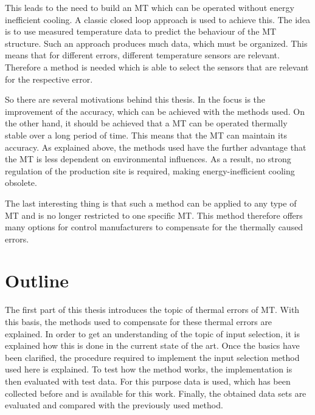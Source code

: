 This leads to the need to build an MT which can be operated without energy inefficient cooling. A classic closed loop approach is used to achieve this. The idea is to use measured temperature data to predict the behaviour of the MT structure. Such an approach produces much data, which must be organized. This means that for different errors, different temperature sensors are relevant. Therefore a method is needed which is able to select the sensors that are relevant for the respective error. 

So there are several motivations behind this thesis. In the focus is the improvement of the accuracy, which can be achieved with the methods used. On the other hand, it should be achieved that a MT can be operated thermally stable over a long period of time. This means that the MT can maintain its accuracy. As explained above, the methods used have the further advantage that the MT is less dependent on environmental influences. As a result, no strong regulation of the production site is required, making energy-inefficient cooling obsolete.

The last interesting thing is that such a method can be applied to any type of MT and is no longer restricted to one specific MT. This method therefore offers many options for control manufacturers to compensate for the thermally caused errors.



\section{Outline} %
\label{sec:outline}


The first part of this thesis introduces the topic of thermal errors of MT. With this basis, the methods used to compensate for these thermal errors are explained. In order to get an understanding of the topic of input selection, it is explained how this is done in the current state of the art. Once the basics have been clarified, the procedure required to implement the input selection method used here is explained. To test how the method works, the implementation is then evaluated with test data. For this purpose data is used, which has been collected before and is available for this work. Finally, the obtained data sets are evaluated and compared with the previously used method.
